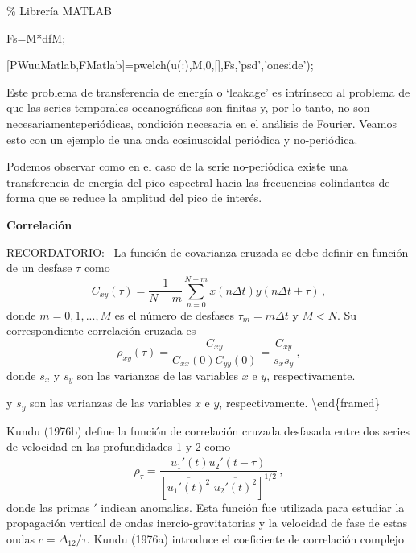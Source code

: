 \documentclass[
]{agujournal2019}
\begin{document}
\begin{framed}

\% Librería MATLAB\

Fs=M*dfM;\

[PWuuMatlab,FMatlab]=pwelch(u(:),M,0,[],Fs,'psd','oneside');\

\end{framed}

Este problema de transferencia de energía o `leakage' es intrínseco al
problema de que las series temporales oceanográficas son finitas y, por
lo tanto, no son necesariamenteperiódicas, condición necesaria en el
análisis de Fourier. Veamos esto con un ejemplo de una onda cosinusoidal
periódica y no-periódica.

\begin{center}
\end{center}

Podemos observar como en el caso de la serie no-periódica existe una
transferencia de energía del pico espectral hacia las frecuencias
colindantes de forma que se reduce la amplitud del pico de interés.

\vspace{0.25cm}

\textbf{Correlación}

\begin{framed}
{ RECORDATORIO:}
\
La función de covarianza cruzada se debe definir en función de un desfase $\tau$ como
 $$C_{xy}(\tau)=\frac{1}{N-m}\sum\limits^{N-m}_{n=0}x(n\Delta t) y(n\Delta t +\tau)\,,$$
donde $m=0,1,...,M$ es el número de desfases $\tau_m=m\Delta t$ y $M<N$.
Su correspondiente correlación cruzada es
  $${\rho}_{xy}(\tau)=\frac{C_{xy}}{C_{xx}(0)C_{yy}(0)}=\frac{C_{xy}}{s_{x}s_{y}}\,,$$
donde $s_x$ y $s_y$ son las varianzas de las variables $x$ e $y$, respectivamente.
\end{framed}

y \(s_y\) son las varianzas de las variables \(x\) e \(y\),
respectivamente. \textbackslash end\{framed\}

Kundu (1976b) define la función de correlación cruzada desfasada entre
dos series de velocidad en las profundidades 1 y 2 como
\[\rho_{\tau}=\frac{\overline{u_1'(t)u_2'(t-\tau)}}
{\left[ \overline{u_1'(t)^2}\,\, \overline{u_2'(t)^2} \right]^{1/2}}\,,\]
donde las primas \('\) indican anomalias. Esta función fue utilizada
para estudiar la propagación vertical de ondas inercio-gravitatorias y
la velocidad de fase de estas ondas \(c=\Delta_{12}/\tau\). Kundu
(1976a) introduce el coeficiente de correlación complejo
\end{document}
